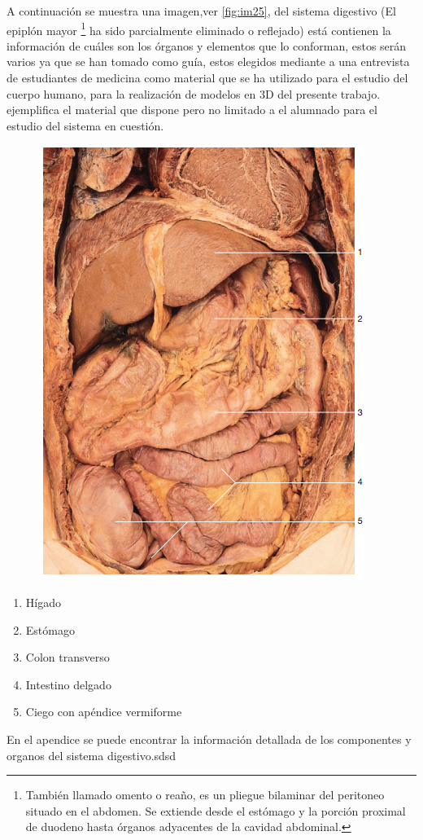 A continuación se muestra una imagen,ver \ref{fig:im25}, del sistema digestivo (El epiplón mayor
\footnote{También llamado omento o reaño, es un pliegue bilaminar del peritoneo situado en el abdomen. Se extiende desde el estómago y la porción proximal de duodeno hasta órganos adyacentes de la cavidad abdominal.} 
ha sido parcialmente eliminado o reflejado)  está contienen la información de cuáles son los órganos y elementos que lo conforman, estos serán 
varios ya que se han tomado como guía, estos elegidos mediante a una entrevista de estudiantes de medicina como material que se ha utilizado para el estudio del cuerpo 
humano, para la realización de modelos en 3D del presente trabajo. ejemplifica el material que dispone pero no limitado a el alumnado para el estudio del sistema en cuestión.\\
\begin{figure}[H]
	\begin{center}
 		\includegraphics[width = .5\textwidth]{source/images/image72.png}
	\end{center} 
\end{figure}
\begin{enumerate}
	\item Hígado
	\item Estómago
	\item Colon transverso
	\item Intestino delgado
	\item Ciego con apéndice vermiforme	
\end{enumerate}
En el apendice se puede encontrar la información detallada de los componentes y organos del sistema digestivo.sdsd

